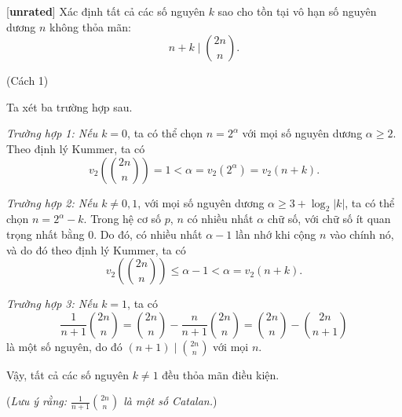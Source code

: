 \documentclass[../06-largest-exponent.tex]{subfiles}
\begin{document}
\begin{example*}\label{example:CHN-2015-P4}[\textbf{unrated}]
	Xác định tất cả các số nguyên \( k \) sao cho tồn tại vô hạn số nguyên dương \( n \) không thỏa mãn:
	\[
		n + k \mid \binom{2n}{n}.
	\]
\end{example*}

\begin{soln}(Cách 1)\footnotemark

	Ta xét ba trường hợp sau.
	
	\textit{Trường hợp 1: Nếu \( k = 0 \)}, ta có thể chọn \( n = 2^\alpha \) với mọi số nguyên dương \( \alpha \geq 2 \).  
	Theo định lý Kummer, ta có
	\[
		v_2\left( \binom{2n}{n} \right) = 1 < \alpha = v_2(2^\alpha) = v_2(n + k).
	\]
		
	\textit{Trường hợp 2: Nếu \( k \neq 0,1 \)}, với mọi số nguyên dương \( \alpha \geq 3 + \log_2 |k| \), ta có thể chọn  
	\( n = 2^\alpha - k \). Trong hệ cơ số \( p \), \( n \) có nhiều nhất \( \alpha \) chữ số, với chữ số ít quan trọng nhất bằng 0.  
	Do đó, có nhiều nhất \( \alpha-1 \) lần nhớ khi cộng \( n \) vào chính nó\footnotemark, và do đó theo định lý Kummer, ta có  
	\[
		v_2\left( \binom{2n}{n} \right) \leq \alpha - 1 < \alpha = v_2(n + k).
	\]
		
	\textit{Trường hợp 3: Nếu \( k = 1 \)}, ta có  
	\[
		\frac{1}{n+1} \binom{2n}{n} = \binom{2n}{n} - \frac{n}{n+1} \binom{2n}{n} = \binom{2n}{n} - \binom{2n}{n+1}
	\]
	là một số nguyên, do đó \( (n+1) \mid \binom{2n}{n} \) với mọi \( n \).  

	Vậy, tất cả các số nguyên \( k \neq 1 \) đều thỏa mãn điều kiện.

	(\textit{Lưu ý rằng: \( \frac{1}{n+1} \binom{2n}{n} \) là một số Catalan.})
\end{soln}

\end{document}
